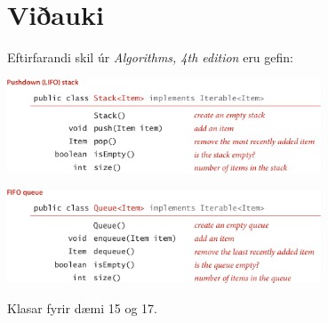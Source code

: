 \documentclass[addpoints]{exam}
\begin{document}

\newpage

\section{Viðauki}
Eftirfarandi skil úr \emph{Algorithms, 4th edition} eru gefin:
\begin{center}

	\includegraphics[width=0.7\textwidth]{Pics/API-Stack}

	\vspace{0.5cm}

	\includegraphics[width=0.7\textwidth]{Pics/API-Queue}

\end{center}

	Klasar fyrir dæmi 15 og 17.
	\begin{multicols}{2}

        \vspace{1cm}

	\end{multicols}
\end{document}
